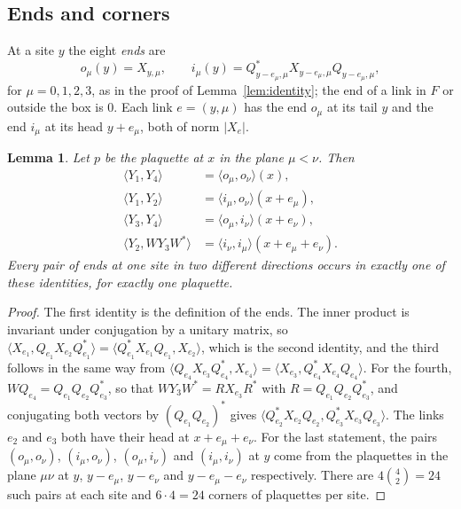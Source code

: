 \documentclass[11pt]{amsart}
\newtheorem{lemma}[theorem]{Lemma}
\theoremstyle{definition}
\theoremstyle{remark}
\numberwithin{equation}{section}
\newcommand{\ip}[2]{\langle #1,#2\rangle}
\begin{document}
\subsection{Ends and corners}

At a site $y$ the eight \emph{ends} are
\[
o_\mu(y)=X_{y,\mu},\qquad
i_\mu(y)=Q^*_{y-e_\mu,\mu}X_{y-e_\mu,\mu}Q_{y-e_\mu,\mu},
\]
for $\mu=0,1,2,3$, as in the proof of Lemma~\ref{lem:identity}; the end of a
link in $F$ or outside the box is $0$. Each link $e=(y,\mu)$ has the end
$o_\mu$ at its tail $y$ and the end $i_\mu$ at its head $y+e_\mu$, both of
norm $|X_e|$.

\begin{lemma}\label{lem:corners}
Let $p$ be the plaquette at $x$ in the plane $\mu<\nu$. Then
\[
\begin{aligned}
\ip{Y_1}{Y_4}&=\ip{o_\mu}{o_\nu}(x),\\
\ip{Y_1}{Y_2}&=\ip{i_\mu}{o_\nu}(x+e_\mu),\\
\ip{Y_3}{Y_4}&=\ip{o_\mu}{i_\nu}(x+e_\nu),\\
\ip{Y_2}{WY_3W^*}&=\ip{i_\nu}{i_\mu}(x+e_\mu+e_\nu).
\end{aligned}
\]
Every pair of ends at one site in two different directions occurs in
exactly one of these identities, for exactly one plaquette.
\end{lemma}

\begin{proof}
The first identity is the definition of the ends. The inner product is
invariant under conjugation by a unitary matrix, so
$\ip{X_{e_1}}{Q_{e_1}X_{e_2}Q_{e_1}^*}=\ip{Q_{e_1}^*X_{e_1}Q_{e_1}}{X_{e_2}}$,
which is the second identity, and the third follows in the same way from
$\ip{Q_{e_4}X_{e_3}Q_{e_4}^*}{X_{e_4}}=\ip{X_{e_3}}{Q_{e_4}^*X_{e_4}Q_{e_4}}$.
For the fourth, $WQ_{e_4}=Q_{e_1}Q_{e_2}Q_{e_3}^*$, so that $WY_3W^*=
RX_{e_3}R^*$ with $R=Q_{e_1}Q_{e_2}Q_{e_3}^*$, and conjugating both vectors
by $(Q_{e_1}Q_{e_2})^*$ gives
$\ip{Q_{e_2}^*X_{e_2}Q_{e_2}}{Q_{e_3}^*X_{e_3}Q_{e_3}}$. The links $e_2$ and
$e_3$ both have their head at $x+e_\mu+e_\nu$. For the last statement, the
pairs $(o_\mu,o_\nu)$, $(i_\mu,o_\nu)$, $(o_\mu,i_\nu)$ and $(i_\mu,i_\nu)$
at $y$ come from the plaquettes in the plane $\mu\nu$ at $y$, $y-e_\mu$,
$y-e_\nu$ and $y-e_\mu-e_\nu$ respectively. There are $4\binom42=24$ such
pairs at each site and $6\cdot4=24$ corners of plaquettes per site.
\end{proof}
\end{document}

